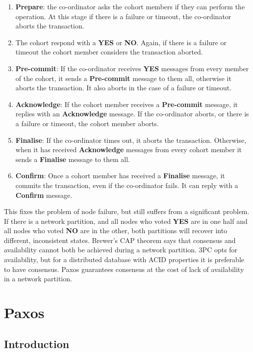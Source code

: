 \documentclass[12pt,twoside,notitlepage]{report}
\newcommand{\msg}[1] {{\bf #1}}         %
\begin{document}
\begin{enumerate}
\item \msg{Prepare}: the co-ordinator asks the cohort members if they can perform the operation. At
	this stage if there is a failure or timeout, the co-ordinator aborts the transaction.
\item The cohort respond with a \msg{YES} or \msg{NO}. Again, if there is a failure or timeout the cohort
	member considers the transaction aborted.
\item \msg{Pre-commit}: If the co-ordinator receives \msg{YES} messages from every member of the
	cohort, it sends a \msg{Pre-commit} message to them all, otherwise it aborts the
	transaction. It also aborts in the case of a failure or timeout.
\item \msg{Acknowledge}: If the cohort member receives a \msg{Pre-commit} message, it replies with
	an \msg{Acknowledge} message. If the co-ordinator aborts, or there is a failure or
	timeout, the cohort member aborts.
\item \msg{Finalise}: If the co-ordinator times out, it aborts the transaction. Otherwise, when it
	has received \msg{Acknowledge} messages from every cohort member it sends a \msg{Finalise}
	message to them all.
\item \msg{Confirm}: Once a cohort member has received a \msg{Finalise} message, it commits the
	transaction, even if the co-ordinator fails. It can reply with a \msg{Confirm} message.
\end{enumerate}

This fixes the problem of node failure, but still suffers from a significant problem. If there is
a network partition, and all nodes who voted \msg{YES} are in one half and all nodes who voted
\msg{NO} are in the other, both partitions will recover into different, inconsistent states.
Brewer's CAP theorem \cite{gilbert2002} says that consensus and availability cannot both be
achieved during a network partition. 3PC opts for availability, but for a distributed
database with ACID properties it is preferable to have consensus. Paxos guarantees consensus at
the cost of lack of availability in a network partition.

\section{Paxos}

\subsection{Introduction}
\end{document}
